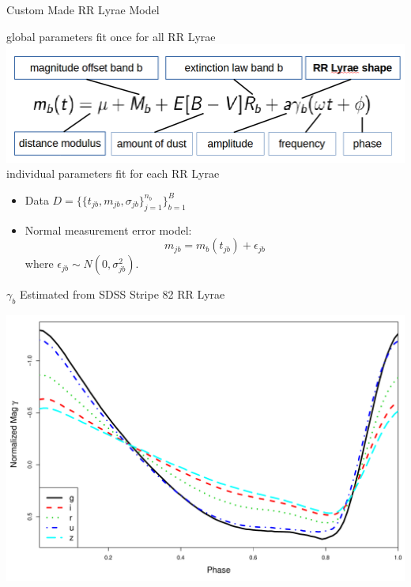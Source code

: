 \documentclass[12pt]{beamer}
\begin{document}
\begin{frame}{Custom Made RR Lyrae Model}


\begin{center}
global parameters fit once for all RR Lyrae\\
\includegraphics[scale=.3]{figs/model.png}\\
individual parameters fit for each RR Lyrae
\end{center}

\vspace{.2in}

\begin{itemize}
\item Data $D=\{\{t_{jb},m_{jb},\sigma_{jb}\}_{j=1}^{n_b}\}_{b=1}^B$
\item Normal measurement error model:
\begin{equation*}
m_{jb} = m_b(t_{jb}) + \epsilon_{jb}
\end{equation*}
where $\epsilon_{jb} \sim N(0,\sigma_{jb}^2)$.
\end{itemize}
\end{frame}

\begin{frame}{$\gamma_b$ Estimated from SDSS Stripe 82 RR Lyrae}

\begin{center}
\includegraphics[scale=.3]{figs/templates.pdf}
\end{center}

\end{frame}
\end{document}
